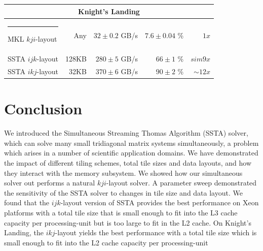\documentclass{sig-alternate-05-2015}
\makeatletter
\newcommand{\thickhline}{%
    \noalign {\ifnum 0=`}\fi \hrule height 1pt
    \futurelet \reserved@a \@xhline
}
\makeatother
\begin{document}
\begin{table}[t]
\begin{tabular}{|l|r|r|r|r|}
    \multicolumn{5}{c}{\rule{0pt}{2.25ex} \textbf{Knight's Landing}} \\ \hline \thickhline
    MKL \(kji\)-layout  &   Any &\(32 \pm 0.2\) GB/s&\(7.6 \pm 0.04\) \%& \(1x\) \\ \hline
    SSTA \(ijk\)-layout & 128KB &\(280 \pm 5\) GB/s&\(66 \pm 1\) \%& \(sim 9x\) \\ \hline
    SSTA \(ikj\)-layout &  32KB &\(370 \pm 6\) GB/s&\(90 \pm 2\) \%& \(\sim 12x\) \\ \hline
  \end{tabular}
  \label{tab:results:summary}
\end{table}


\section{Conclusion}
\label{sec:conclusion}


We introduced the Simultaneous Streaming Thomas Algorithm (SSTA) solver, which
  can solve many small tridiagonal matrix systems simultaneously, a
  problem which arises in a number of scientific application domains.
We have demonstrated the impact of different tiling schemes, total tile sizes
  and data layouts, and how they interact with the memory subsystem.
We showed how our simultaneous solver out performs a natural \(kji\)-layout
  solver.
A parameter sweep demonstrated the sensitivity of the SSTA solver to changes in
  tile size and data layout.
We found that the \(ijk\)-layout version of SSTA provides the best performance
  on Xeon platforms with a total tile size that is small enough to fit into the
  L3 cache capacity per processing-unit but is too large to fit in the L2 cache.
On Knight's Landing, the \(ikj\)-layout yields the best performance with a
  total tile size which is small enough to fit into the L2 cache capacity per
  processing-unit
\end{document}
